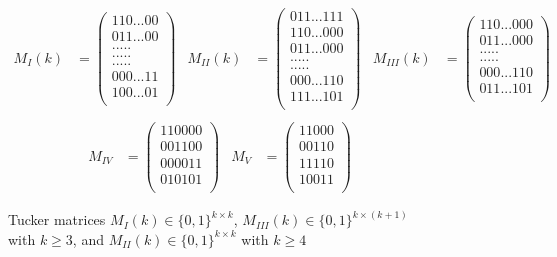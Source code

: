 \documentclass[12pt]{book}
\theoremstyle{plain}
\theoremstyle{remark}
\begin{document}
\begin{figure}[h!] 
	\centering
	\begin{align*}
			M_I(k)&= \begin{pmatrix}
				110...00\\
				011...00\\
				.   .   .   .   . \\
				.   .   .   .   . \\
				.   .   .   .   . \\
				000...11\\
				100...01\\
			\end{pmatrix}
			&
			M_{II}(k)&= \begin{pmatrix}
				011...111\\
				110...000\\
				011...000\\
				.   .   .   .   . \\
				.   .   .   .   . \\
				000...110\\
				111...101\\
			\end{pmatrix}
			&
			M_{III}(k)&= \begin{pmatrix}
				110...000\\
				011...000\\
				.   .   .   .   . \\
				.   .   .   .   . \\
				000...110\\
				011...101\\
			\end{pmatrix}
			\\
			\end{align*}
			\begin{align*}
			M_{IV}&= \begin{pmatrix}
				110000\\
				001100\\
				000011\\
				010101\\
			\end{pmatrix}
			&
			M_{V}&= \begin{pmatrix}
				11000\\
				00110\\
				11110\\
				10011\\
			\end{pmatrix}
	\end{align*}
	\caption{Tucker matrices $M_{I}(k) \in \{0,1\}^{k \times k}$, $M_{III}(k) \in \{0,1\}^{k \times (k+1)}$ with $k \geq 3$, and $M_{II}(k) \in \{0,1\}^{k \times k}$ with $k \geq 4$} \label{fig:tucker_matrices}
\end{figure} 
 
\end{document}
